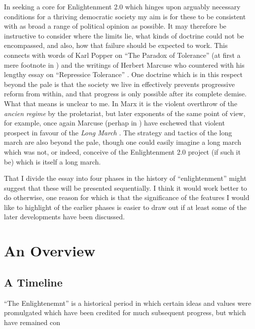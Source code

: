 \documentclass[10pt,titlepage]{article}
\begin{document}
In seeking a core for Enlightenment 2.0 which hinges upon arguably necessary conditions for a thriving democratic society my aim is for these to be consistent with as broad a range of political opinion as possible.
It may therefore be instructive to consider where the limits lie, what kinds of doctrine could not be encompassed, and also, how that failure should be expected to work.
This connects with words of Karl Popper on ``The Paradox of Tolerance'' (at first a mere footnote in \cite{popper-ose}) and the writings of Herbert Marcuse who countered with his lengthy essay on ``Repressice Tolerance'' \cite{marcuse-repressive}.
One doctrine which is in this respect beyond the pale is that the society we live in effectively prevents progressive reform from within, and that progress is only possible after its complete demise.
What that means is unclear to me.
In Marx it is the violent overthrow of the \emph{ancien regime} by the proletariat, but later exponents of the same point of view, for example, once again Marcuse (perhap in \cite{marcuse-liberation}) have eschewed that violent prospect in favour of the \emph{Long March} \cite{sidwell-long}.
The strategy and tactics of the long march are also beyond the pale, though one could easily imagine a long march which was not, or indeed, conceive of the Enlightenment 2.0 project (if such it be) which is itself a long march.


That I divide the essay into four phases in the history of ``enlightenment'' might suggest that these will be presented sequentially.
I think it would work better to do otherwise, one reason for which is that the significance of the features I would like to highlight of the earlier phases is easier to draw out if at least some of the later developments have been discussed.

\section{An Overview}

\subsection{A Timeline}

``The Enlightenemnt'' is a historical period in which certain ideas and values were promulgated which have been credited for much subsequent progress, but which have remained con
\end{document}

